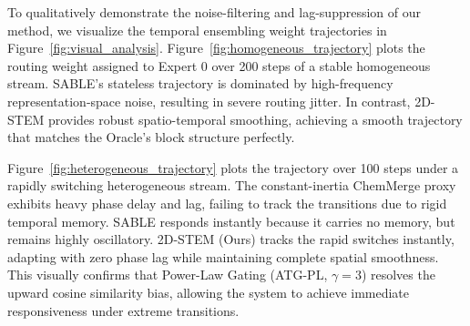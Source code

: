 To qualitatively demonstrate the noise-filtering and lag-suppression of our method, we visualize the temporal ensembling weight trajectories in Figure~\ref{fig:visual_analysis}.
Figure~\ref{fig:homogeneous_trajectory} plots the routing weight assigned to Expert 0 over 200 steps of a stable homogeneous stream. SABLE's stateless trajectory is dominated by high-frequency representation-space noise, resulting in severe routing jitter. In contrast, 2D-STEM provides robust spatio-temporal smoothing, achieving a smooth trajectory that matches the Oracle's block structure perfectly. 

Figure~\ref{fig:heterogeneous_trajectory} plots the trajectory over 100 steps under a rapidly switching heterogeneous stream. The constant-inertia ChemMerge proxy exhibits heavy phase delay and lag, failing to track the transitions due to rigid temporal memory. SABLE responds instantly because it carries no memory, but remains highly oscillatory. 2D-STEM (Ours) tracks the rapid switches instantly, adapting with zero phase lag while maintaining complete spatial smoothness. This visually confirms that Power-Law Gating (ATG-PL, $\gamma=3$) resolves the upward cosine similarity bias, allowing the system to achieve immediate responsiveness under extreme transitions.
